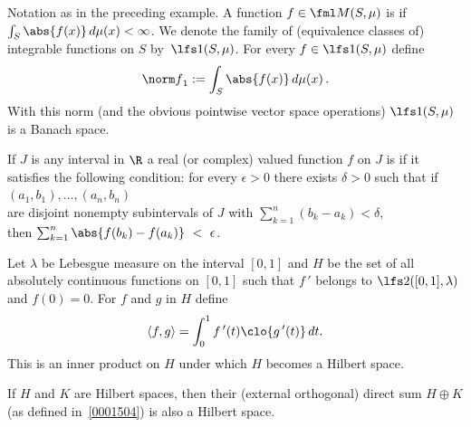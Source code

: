 \begin{exam}\label{exam_L1S} Notation as in the preceding example.  A function $f \in \fml M(S,\mu)$ is
 if $\int_S \abs{f(x)}\,d\mu(x) < \infty$.  We denote the family of
(equivalence classes of) integrable functions on $S$ by~$\lfs 1(S,\mu)$.
For every $f \in \lfs 1(S,\mu)$ define
    \[ {\norm f}_1 := \int_S \abs{f(x)}\,d\mu(x)\,. \]
With this norm (and the obvious pointwise vector space operations) $\lfs 1(S,\mu)$ is a Banach space.
\end{exam}

\begin{defn} If $J$ is any interval in $\R$ a real (or complex) valued function $f$ on $J$ is
 if it satisfies the following condition:
  \quote for every $\epsilon > 0$ there exists $\delta > 0$ such
 that if $(a_1,b_1), \dots,(a_n,b_n)$ \\
 are disjoint nonempty subintervals of $J$ with $\sum_{k=1}^n(b_k - a_k) < \delta$, \\
 then $\sum_{k=1}^n\abs{f(b_k) - f(a_k)}~<~\epsilon$.
  \endquote
\end{defn}

\begin{exam}\label{exam_Hsp_abs_cont} Let $\lambda$ be Lebesgue measure on the interval $[0,1]$ and $H$ be the set of all
absolutely continuous functions on $[0,1]$ such that $f\,'$ belongs to $\lfs 2([0,1],\lambda)$ and $f(0) = 0$.
For $f$ and $g$ in $H$ define
   \[ \langle f,g \rangle = \int_0^1 f\,'(t)\clo{g\,'(t)}\,dt. \]
This is an inner product on $H$ under which $H$ becomes a Hilbert space.
\end{exam}

\begin{exam} If $H$ and $K$ are Hilbert spaces, then their (external orthogonal) direct sum $H \oplus K$
(as defined in~\ref{0001504}) is also a Hilbert space.
\end{exam}


















